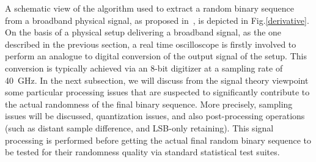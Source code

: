 %
A schematic view of the algorithm used to extract a random binary sequence from a broadband physical signal, as proposed in~\cite{ultrafast2010}, is depicted in Fig.\ref{derivative}. On the basis of a physical setup delivering a broadband signal, as the one described in the previous section, a real time oscilloscope is firstly involved to perform an analogue to digital conversion of the output signal of the setup. This conversion is typically achieved via an 8-bit digitizer at a sampling rate of 40~GHz. In the next subsection, we will discuss from the signal theory viewpoint some particular processing issues that are suspected to significantly contribute to the actual randomness of the final binary sequence. More precisely, sampling issues will be discussed, quantization issues, and also post-processing operations (such as distant sample difference, and LSB-only retaining). This signal processing is performed before getting the actual final random binary sequence to be tested for their randomness quality via 
standard statistical test suites.
%
